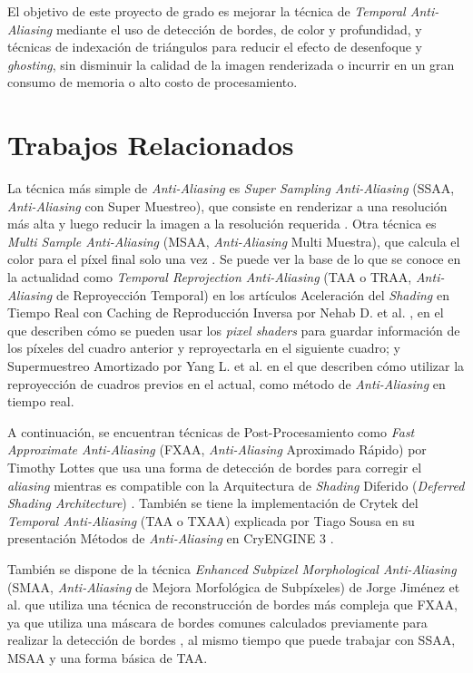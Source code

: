 \documentclass[pregrado]{tesis-usb} %
\begin{document}
El objetivo de este proyecto de grado es mejorar la técnica de \textit{Temporal Anti-Aliasing} mediante el uso de detección de bordes, de color y profundidad, y técnicas de indexación de triángulos para reducir el efecto de desenfoque y \textit{ghosting}, sin disminuir la calidad de la imagen renderizada o incurrir en un gran consumo de memoria o alto costo de procesamiento.


\section{Trabajos Relacionados}
La técnica más simple de \textit{Anti-Aliasing} es \textit{Super Sampling Anti-Aliasing} (SSAA, \textit{Anti-Aliasing} con Super Muestreo), que consiste en renderizar a una resolución más alta y luego reducir la imagen a la resolución requerida \cite{Doggett2017EDAN35}. Otra técnica es \textit{Multi Sample Anti-Aliasing} (MSAA, \textit{Anti-Aliasing} Multi Muestra), que calcula el color para el píxel final solo una vez \cite{Doggett2017EDAN35}. Se puede ver la base de lo que se conoce en la actualidad como \textit{Temporal Reprojection Anti-Aliasing} (TAA o TRAA, \textit{Anti-Aliasing} de Reproyección Temporal) en los artículos Aceleración del \textit{Shading} en Tiempo Real con Caching de Reproducción Inversa por Nehab D. et al.  \cite{Nehab2007}, en el que describen cómo se pueden usar los \textit{pixel shaders} para guardar información de los píxeles del cuadro anterior y reproyectarla en el siguiente cuadro; y Supermuestreo Amortizado por Yang L. et al.  \cite{Yang2009} en el que describen cómo utilizar la reproyección de cuadros previos  en el actual, como método de \textit{Anti-Aliasing} en tiempo real.

A continuación, se encuentran técnicas de Post-Procesamiento como \textit{Fast Approximate Anti-Aliasing} (FXAA, \textit{Anti-Aliasing} Aproximado Rápido) por Timothy Lottes \cite{Lottes2009} que usa una forma de detección de bordes para corregir el \textit{aliasing} mientras es compatible con la Arquitectura de \textit{Shading} Diferido (\textit{Deferred Shading Architecture}) \cite{Doggett2017EDAN35}. También se tiene la implementación de Crytek del \textit{Temporal Anti-Aliasing} (TAA o TXAA) explicada por Tiago Sousa en su presentación Métodos de \textit{Anti-Aliasing} en CryENGINE 3 \cite{JIMENEZ2011_SIGGRAPH11}.

También se dispone de la técnica \textit{Enhanced Subpixel Morphological Anti-Aliasing} (SMAA, \textit{Anti-Aliasing} de Mejora Morfológica de Subpíxeles) de Jorge Jiménez et al. \cite{Jimenez2012} que utiliza una técnica de reconstrucción de bordes más compleja que FXAA, ya que utiliza una máscara de bordes comunes calculados previamente para realizar la detección de bordes , al mismo tiempo que puede trabajar con SSAA, MSAA y una forma básica de TAA.
\end{document}
